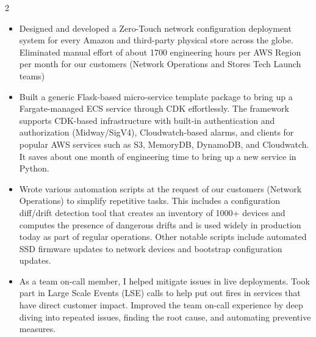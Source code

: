 \documentclass[10pt,a4paper,ragged2e,withhyper]{altacv}
\begin{document}
\begin{paracol}{2}
\begin{itemize}
\item
    \begin{justify}
    Designed and developed a Zero-Touch network configuration deployment system for every Amazon and third-party
    physical store across the globe. Eliminated manual effort of about 1700 engineering hours per AWS Region per month for our customers (Network Operations and Stores Tech Launch teams)
    \end{justify}
\item
    \begin{justify}
    Built a generic Flask-based micro-service template package to bring up a Fargate-managed ECS service through CDK effortlessly. The framework supports CDK-based infrastructure with built-in authentication and authorization (Midway/SigV4), Cloudwatch-based alarms, and clients for popular AWS services such as S3, MemoryDB, DynamoDB, and Cloudwatch. It saves about one month of engineering time to bring up a new service in Python.
    \end{justify}
\item
    \begin{justify}
    Wrote various automation scripts at the request of our customers (Network Operations) to simplify repetitive tasks. This includes a configuration diff/drift detection tool that creates an inventory of 1000+ devices and computes the presence of dangerous drifts and is used widely in production today as part of regular operations. Other notable scripts include automated SSD firmware updates to network devices and bootstrap configuration updates.
    \end{justify}
\item
    \begin{justify}
    As a team on-call member, I helped mitigate issues in live deployments. Took part in Large Scale Events (LSE) calls to help put out fires in services that have direct customer impact. Improved the team on-call experience by deep diving into repeated issues, finding the root cause, and automating preventive measures.
    \end{justify}
\end{itemize}

\divider


\end{paracol}
\end{document}
